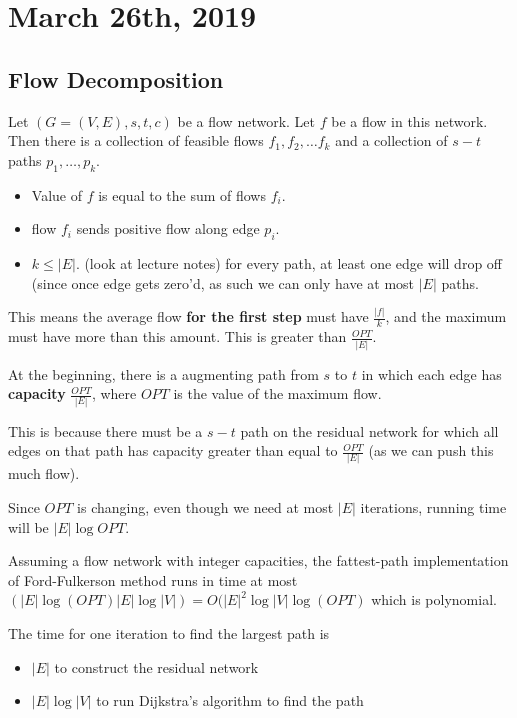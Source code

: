 \documentclass[../main/main.tex]{subfiles}
\begin{document}
\section{March 26th, 2019}
\subsection{Flow Decomposition}
\begin{lemma}
	Let $\left( G=(V,E),s,t,c \right) $ be a flow network. Let $f$ be a flow in this network. Then there is a collection of feasible flows  $f_1,f_2,\ldots f_k$ and a collection of $s-t$ paths $p_1,\ldots,p_k$.
\end{lemma}
\begin{itemize}
	\item Value of $f$ is equal to the sum of flows $f_i$.
	\item flow $f_i$ sends positive flow along edge $p_i$.
	\item  $k\le |E|$. (look at lecture notes) for every path, at least one edge will drop off (since once edge gets zero'd, as such we can only have at most $|E|$ paths.
\end{itemize}

This means the average flow \textbf{for the first step} must have $\frac{|f|}{k}$, and the maximum must have more than this amount. This is greater than $\frac{OPT}{|E|}$.

\begin{corollary}
	\label{begMinEdgeCap}
	At the beginning, there is a augmenting path from $s$ to $t$ in which each edge has \textbf{capacity} $\frac{OPT}{|E|}$, where $OPT$ is the value of the maximum flow.
\end{corollary}

This is because there must be a $s-t$ path on the residual network for which all edges on that path has capacity greater than equal to $\frac{OPT}{|E|}$ (as we can push this much flow). 

Since $OPT$ is changing, even though we need at most $|E|$ iterations, running time will be $|E|\log OPT$.

 \begin{theorem}
	 Assuming a flow network with integer capacities, the fattest-path implementation of Ford-Fulkerson method runs in time at most $\left( |E|\log \left( OPT \right) |E|\log |V| \right)=O(|E|^2\log |V| \log (OPT) $ which is polynomial.
\end{theorem}
The time for one iteration to find the largest path is
\begin{itemize}
	\item $|E|$ to construct the residual network
	\item $|E|\log |V|$ to run Dijkstra's algorithm to find the path 
\end{itemize}
\end{document}
